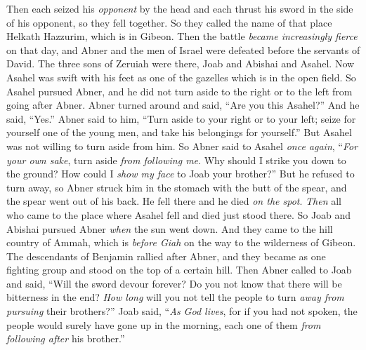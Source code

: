 \begin{biblechapter}
\verse Then each seized his \textit{opponent} by the head and each thrust his sword in the side of his opponent, so they fell together. So they called the name of that place Helkath Hazzurim, which is in Gibeon.
\verse Then the battle \textit{became increasingly fierce} on that day, and Abner and the men of Israel were defeated before the servants of David.
\verse The three sons of Zeruiah were there, Joab and Abishai and Asahel. Now Asahel was swift with his feet as one of the gazelles which is in the open field.
\verse So Asahel pursued Abner, and he did not turn aside to the right or to the left from going after Abner.
\verse Abner turned around and said, “Are you this Asahel?” And he said, “Yes.”
\verse Abner said to him, “Turn aside to your right or to your left; seize for yourself one of the young men, and take his belongings for yourself.” But Asahel was not willing to turn aside from him.
\verse So Abner said to Asahel \textit{once again}, “\textit{For your own sake}, turn aside \textit{from following me}. Why should I strike you down to the ground? How could I \textit{show my face} to Joab your brother?”
\verse But he refused to turn away, so Abner struck him in the stomach with the butt of the spear, and the spear went out of his back. He fell there and he died \textit{on the spot}. \textit{Then} all who came to the place where Asahel fell and died just stood there.
\verse So Joab and Abishai pursued Abner \textit{when} the sun went down. And they came to the hill country of Ammah, which is \textit{before Giah} on the way to the wilderness of Gibeon.
\verse The descendants of Benjamin rallied after Abner, and they became as one fighting group and stood on the top of a certain hill.
\verse Then Abner called to Joab and said, “Will the sword devour forever? Do you not know that there will be bitterness in the end? \textit{How long} will you not tell the people to turn \textit{away from pursuing} their brothers?”
\verse Joab said, “\textit{As God lives}, for if you had not spoken, the people would surely have gone up in the morning, each one of them \textit{from following after} his brother.”

\end{biblechapter}
